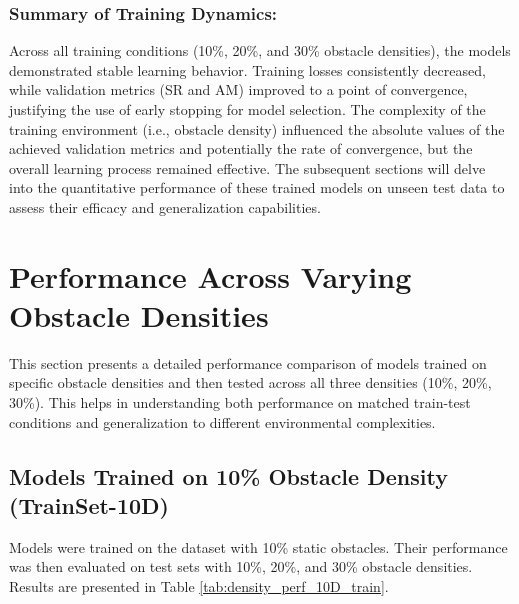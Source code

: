 \subsubsection{Summary of Training Dynamics:}
Across all training conditions (10\%, 20\%, and 30\% obstacle densities), the models demonstrated stable learning behavior. Training losses consistently decreased, while validation metrics (SR and AM) improved to a point of convergence, justifying the use of early stopping for model selection. The complexity of the training environment (i.e., obstacle density) influenced the absolute values of the achieved validation metrics and potentially the rate of convergence, but the overall learning process remained effective. The subsequent sections will delve into the quantitative performance of these trained models on unseen test data to assess their efficacy and generalization capabilities.
\section{Performance Across Varying Obstacle Densities}
\label{sec:perf_obstacle_density_detailed}
This section presents a detailed performance comparison of models trained on specific obstacle densities and then tested across all three densities (10\%, 20\%, 30\%). This helps in understanding both performance on matched train-test conditions and generalization to different environmental complexities.

\subsection{Models Trained on 10\% Obstacle Density (TrainSet-10D)}
\label{subsec:perf_10D_train_detailed}
Models were trained on the dataset with 10\% static obstacles. Their performance was then evaluated on test sets with 10\%, 20\%, and 30\% obstacle densities. Results are presented in Table \ref{tab:density_perf_10D_train}.

